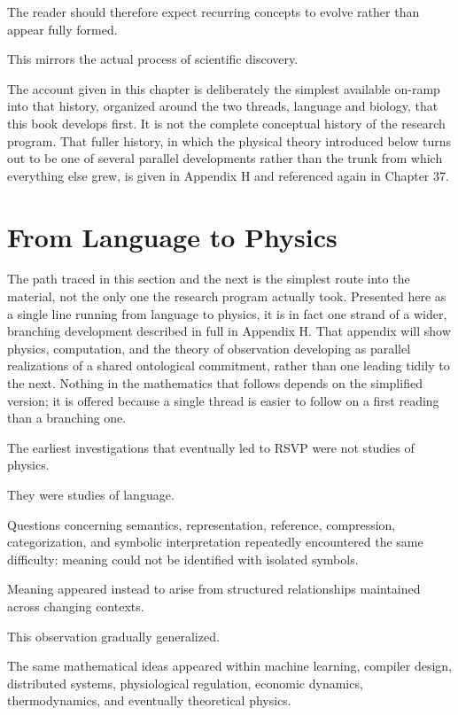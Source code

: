 \documentclass[11pt,oneside]{book}
\numberwithin{equation}{chapter}
\theoremstyle{definition}
\theoremstyle{plain}
\begin{document}
The reader should therefore expect recurring concepts to evolve rather than
appear fully formed.

This mirrors the actual process of scientific discovery.

The account given in this chapter is deliberately the simplest available
on-ramp into that history, organized around the two threads, language and
biology, that this book develops first. It is not the complete
conceptual history of the research program. That fuller history, in which
the physical theory introduced below turns out to be one of several
parallel developments rather than the trunk from which everything else
grew, is given in Appendix H and referenced again in Chapter 37.

\section{From Language to Physics}

The path traced in this section and the next is the simplest route into
the material, not the only one the research program actually took.
Presented here as a single line running from language to physics, it is
in fact one strand of a wider, branching development described in full in
Appendix H. That appendix will show physics, computation, and the theory
of observation developing as parallel realizations of a shared
ontological commitment, rather than one leading tidily to the next.
Nothing in the mathematics that follows depends on the simplified version;
it is offered because a single thread is easier to follow on a first
reading than a branching one.

The earliest investigations that eventually led to RSVP were not studies of
physics.

They were studies of language.

Questions concerning semantics, representation, reference, compression,
categorization, and symbolic interpretation repeatedly encountered the same
difficulty: meaning could not be identified with isolated symbols.

Meaning appeared instead to arise from structured relationships maintained
across changing contexts.

This observation gradually generalized.

The same mathematical ideas appeared within machine learning, compiler
design, distributed systems, physiological regulation, economic dynamics,
thermodynamics, and eventually theoretical physics.
\end{document}
